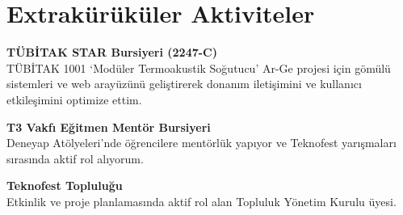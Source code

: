 \section{Extrakürüküler Aktiviteler}

\textbf{TÜBİTAK STAR Bursiyeri (2247-C)} \\
TÜBİTAK 1001 `Modüler Termoakustik Soğutucu' Ar-Ge projesi için gömülü sistemleri ve web arayüzünü geliştirerek donanım iletişimini ve kullanıcı etkileşimini optimize ettim.

\vspace{0.3em}

\textbf{T3 Vakfı Eğitmen Mentör Bursiyeri} \\
Deneyap Atölyeleri'nde öğrencilere mentörlük yapıyor ve Teknofest yarışmaları sırasında aktif rol alıyorum.

\vspace{0.3em}

\textbf{Teknofest Topluluğu} \\
Etkinlik ve proje planlamasında aktif rol alan Topluluk Yönetim Kurulu üyesi.
